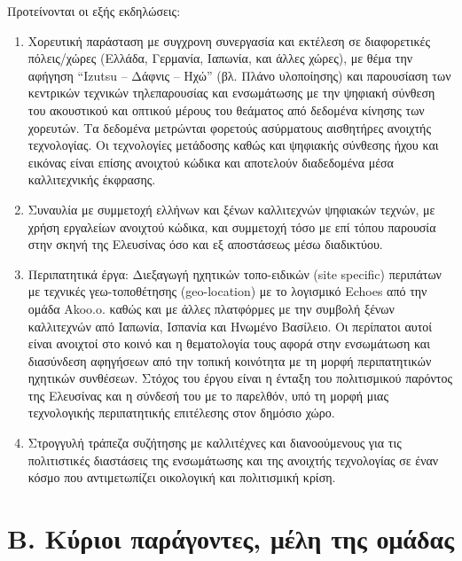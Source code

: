 Προτείνονται οι εξής εκδηλώσεις:

\begin{enumerate}
\item Χορευτική παράσταση με συγχρονη συνεργασία και εκτέλεση σε διαφορετικές πόλεις/χώρες (Ελλάδα, Γερμανία, Ιαπωνία, και άλλες χώρες), με θέμα την αφήγηση “Izutsu – Δάφνις – Ηχώ” (βλ. Πλάνο υλοποίησης) και παρουσίαση των κεντρικών τεχνικών τηλεπαρουσίας και ενσωμάτωσης με την ψηφιακή σύνθεση του ακουστικού και οπτικού μέρους του θεάματος από δεδομένα κίνησης των χορευτών. Τα δεδομένα μετρώνται φορετούς ασύρματους αισθητήρες ανοιχτής τεχνολογίας. Οι τεχνολογίες μετάδοσης καθώς και ψηφιακής σύνθεσης ήχου και εικόνας είναι επίσης ανοιχτού κώδικα και αποτελούν διαδεδομένα μέσα καλλιτεχνικής έκφρασης.

\item Συναυλία με συμμετοχή ελλήνων και ξένων καλλιτεχνών ψηφιακών τεχνών, με χρήση εργαλείων ανοιχτού κώδικα, και συμμετοχή τόσο με επί τόπου παρουσία στην σκηνή της Ελευσίνας όσο και εξ αποστάσεως μέσω διαδικτύου.

\item Περιπατητικά έργα: Διεξαγωγή ηχητικών τοπο-ειδικών (site specific) περιπάτων με τεχνικές γεω-τοποθέτησης (geo-location) με το λογισμικό Εchoes από την ομάδα Akoo.o.  καθώς και με άλλες πλατφόρμες με την συμβολή ξένων καλλιτεχνών από Ιαπωνία, Ισπανία και Ηνωμένο Βασίλειο.  Oι περίπατοι αυτοί είναι ανοιχτοί στο κοινό και η θεματολογία τους αφορά στην ενσωμάτωση και διασύνδεση αφηγήσεων από την τοπική κοινότητα με τη μορφή περιπατητικών ηχητικών συνθέσεων. Στόχος του έργου είναι η ένταξη του πολιτισμικού παρόντος της Ελευσίνας και η σύνδεσή του με το παρελθόν, υπό τη μορφή μιας τεχνολογικής περιπατητικής επιτέλεσης στον δημόσιο χώρο.

\item Στρογγυλή τράπεζα συζήτησης με καλλιτέχνες και διανοούμενους για τις πολιτιστικές διαστάσεις της ενσωμάτωσης και της ανοιχτής τεχνολογίας σε έναν κόσμο που αντιμετωπίζει οικολογική και πολιτισμική κρίση.
\end{enumerate}

\section{Β. Κύριοι παράγοντες, μέλη της ομάδας}
\label{sec:org30795c7}

